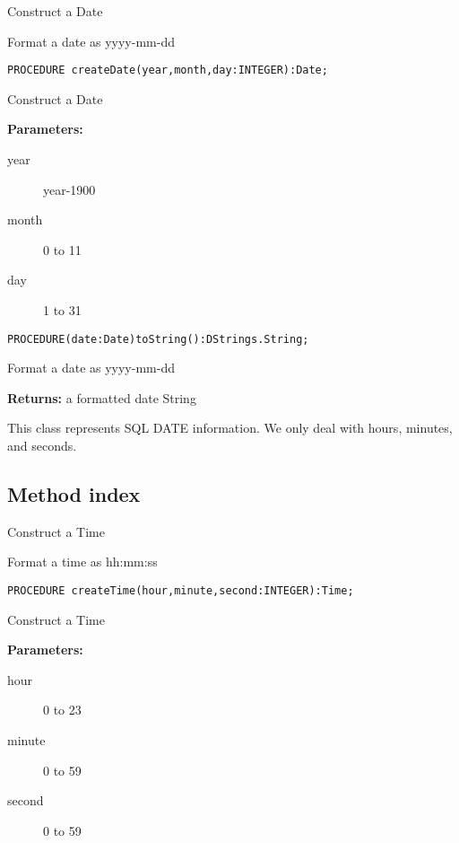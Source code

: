 \begin{description}
     Construct a Date 

     Format a date as yyyy-mm-dd 
\end{description}
                              


\verb'PROCEDURE createDate(year,month,day:INTEGER):Date;'

     Construct a Date 

     {\bf Parameters: }
\begin{description}
\item[year] year-1900 
\item[month] 0 to 11 
\item[day] 1 to 31 
\end{description}

                    

\verb'PROCEDURE(date:Date)toString():DStrings.String;'

     Format a date as yyyy-mm-dd 

     {\bf Returns: } 
          a formatted date String 



\renewcommand{\CurClass}{Time}
\Class{}

This class represents SQL DATE information. 
We only deal with hours,
minutes, and seconds. 


\subsection{Method index}

\begin{description}
     Construct a Time 

     Format a time as hh:mm:ss 
\end{description}



\verb'PROCEDURE createTime(hour,minute,second:INTEGER):Time;'

     Construct a Time 

     {\bf Parameters: }
\begin{description}
\item[hour] 0 to 23 
\item[minute] 0 to 59 
\item[second] 0 to 59 
\end{description}

